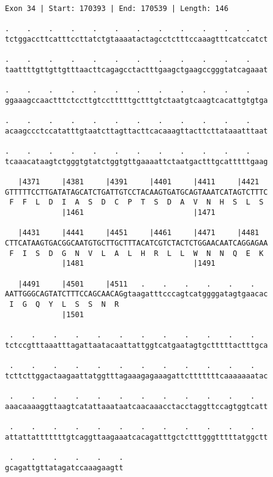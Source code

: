 \documentclass{article}
\begin{document}
\begin{Verbatim}[fontfamily=courier]
Exon 34 | Start: 170393 | End: 170539 | Length: 146

.    .    .    .    .    .    .    .    .    .    .    .    
tctggaccttcatttccttatctgtaaaatactagcctctttccaaagtttcatccatct

.    .    .    .    .    .    .    .    .    .    .    .    
taattttgttgttgtttaacttcagagcctactttgaagctgaagccgggtatcagaaat

.    .    .    .    .    .    .    .    .    .    .    .    
ggaaagccaactttctccttgtcctttttgctttgtctaatgtcaagtcacattgtgtga

.    .    .    .    .    .    .    .    .    .    .    .    
acaagccctccatatttgtaatcttagttacttcacaaagttacttcttataaatttaat

.    .    .    .    .    .    .    .    .    .    .    .    
tcaaacataagtctgggtgtatctggtgttgaaaattctaatgactttgcatttttgaag

   |4371     |4381     |4391     |4401     |4411     |4421  
GTTTTTCCTTGATATAGCATCTGATTGTCCTACAAGTGATGCAGTAAATCATAGTCTTTC
 F  F  L  D  I  A  S  D  C  P  T  S  D  A  V  N  H  S  L  S 
             |1461                         |1471            

   |4431     |4441     |4451     |4461     |4471     |4481  
CTTCATAAGTGACGGCAATGTGCTTGCTTTACATCGTCTACTCTGGAACAATCAGGAGAA
 F  I  S  D  G  N  V  L  A  L  H  R  L  L  W  N  N  Q  E  K 
             |1481                         |1491            

   |4491     |4501     |4511   .    .    .    .    .    .   
AATTGGGCAGTATCTTTCCAGCAACAGgtaagatttcccagtcatggggatagtgaacac
 I  G  Q  Y  L  S  S  N  R                                  
             |1501                                          

 .    .    .    .    .    .    .    .    .    .    .    .   
tctccgtttaaatttagattaatacaattattggtcatgaatagtgctttttactttgca

 .    .    .    .    .    .    .    .    .    .    .    .   
tcttcttggactaagaattatggtttagaaagagaaagattctttttttcaaaaaaatac

 .    .    .    .    .    .    .    .    .    .    .    .   
aaacaaaaggttaagtcatattaaataatcaacaaacctacctaggttccagtggtcatt

 .    .    .    .    .    .    .    .    .    .    .    .   
attattatttttttgtcaggttaagaaatcacagatttgctctttgggtttttatggctt

 .    .    .    .    .    .
gcagattgttatagatccaaagaagtt
\end{Verbatim}
\end{document}
